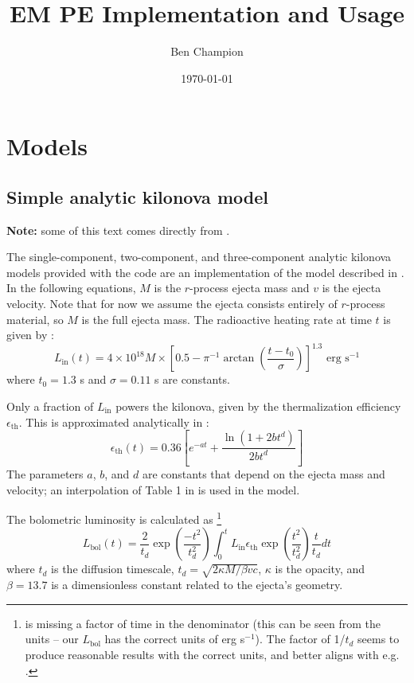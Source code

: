 \documentclass{article}
\begin{document}
\title{EM PE Implementation and Usage}

%
\author{Ben Champion}

\date{\today}

\maketitle

\section{Models}

\subsection{Simple analytic kilonova model}

\textbf{Note:} some of this text comes directly from \cite{Villar_2017}.

The single-component, two-component, and three-component analytic kilonova models provided with the code are an implementation of the model described in \cite{Villar_2017}.
In the following equations, $M$ is the $r$-process ejecta mass and $v$ is the ejecta velocity.
Note that for now we assume the ejecta consists entirely of $r$-process material, so $M$ is the full ejecta mass.
The radioactive heating rate at time $t$ is given by \cite{Korobkin_2012}:
\begin{equation}
    L_\text{in}(t) = 4 \times 10^{18} M \times \left [ 0.5 - \pi^{-1} \arctan \left ( \frac {t - t_0} {\sigma} \right ) \right ]^{1.3} \text{ erg s}^{-1}
\end{equation}
where $t_0 = 1.3$ s and $\sigma = 0.11$ s are constants.

Only a fraction of $L_\text{in}$ powers the kilonova, given by the thermalization efficiency $\epsilon_\text{th}$.
This is approximated analytically in \cite{Barnes_2016}:
\begin{equation}
    \epsilon_\text{th}(t) = 0.36 \left [ e^{-a t} + \frac {\ln(1 + 2 b t^d)} {2 b t^d} \right ]
\end{equation}
The parameters $a$, $b$, and $d$ are constants that depend on the ejecta mass and velocity; an interpolation of Table 1 in \cite{Barnes_2016} is used in the model.

The bolometric luminosity is calculated as
\footnote{\cite{Villar_2017} is missing a factor of time in the denominator (this can be seen from the units -- our $L_\text{bol}$ has the correct units of erg s$^{-1}$). 
The factor of 1/$t_d$ seems to produce reasonable results with the correct units, and better aligns with e.g. \cite{Chatzopoulos_2012}.}
\begin{equation}
    L_\text{bol}(t) = \frac {2} {t_d} \exp{\left ( \frac {-t^2} {t_d^2} \right ) }
                    \int_0^t L_\text{in} \epsilon_\text{th} \exp{\left ( \frac {t^2} {t_d^2} \right ) } \frac {t} {t_d} dt
\end{equation}
where $t_d$ is the diffusion timescale, $t_d = \sqrt{2 \kappa M / \beta v c}$, $\kappa$ is the opacity, and $\beta = 13.7$ is a dimensionless constant related to the ejecta's geometry.
\end{document}
